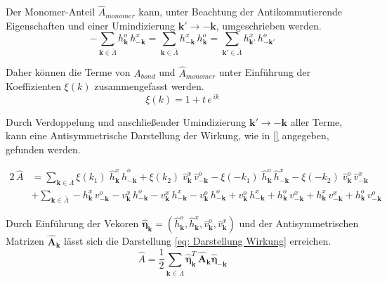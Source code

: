 \noindent Der Monomer-Anteil $\hat{A}_{monomer}$ kann, unter Beachtung der Antikommutierende Eigenschaften und einer Umindizierung $\bm{k'} \rightarrow -\bm{k}$, umgeschrieben werden.
\begin{equation}
-\sum_{\bm{k} \in \bar{\Lambda}} h_{\bm{k}}^o \,h_{-\bm{k}}^x = \sum_{\bm{k} \in \bar{\Lambda}} h_{-\bm{k}}^x \, h_{\bm{k}}^o  = 
\sum_{\bm{k'} \in \bar{\Lambda}} h_{\bm{k'}}^x \, h_{-\bm{k'}}^o  
\end{equation}

\noindent Daher können die Terme von $A_{bond}$ und $\hat{A}_{monomer}$ unter Einführung der Koeffizienten $\xi(k)$ zusammengefasst werden. 
\begin{equation} 
\xi(k) = 1 + t\,e^{\,ik} 
\end{equation}

\noindent Durch Verdoppelung und anschließender Umindizierung $\bm{k'} \rightarrow -\bm{k}$ aller Terme, kann eine Antisymmetrische Darstellung der Wirkung, wie in \eqref{} angegeben, gefunden werden.

\begin{align}
    2\,\hat{A}  
        &= \sum_{\bm{k} \in \bar{\Lambda}}  
        \xi(k_1) \; \hat{h}_{\bm{k}}^{x} \,\hat{h}_{-\bm{k}}^{o} 
        + \xi(k_2) \; \hat{v}_{\bm{k}}^{x} \,\hat{v}_{-\bm{k}}^{o}  
        - \xi(-k_1) \;  \hat{h}_{\bm{k}}^{o} \,\hat{h}_{-\bm{k}}^{x}
        - \xi(-k_2) \; \hat{v}_{\bm{k}}^{o} \,\hat{v}_{-\bm{k}}^{x}   \nonumber\\
        & + \sum_{\bm{k} \in \bar{\Lambda}}  
        - h_{\bm{k}}^x \,v_{-\bm{k}}^o 
        - v_{\bm{k}}^x\, h_{-\bm{k}}^o
        - v_{\bm{k}}^x \,h_{-\bm{k}}^x 
        - v_{\bm{k}}^o \,h_{-\bm{k}}^o 
        + v_{\bm{k}}^o \, h_{-\bm{k}}^x  
        + h_{\bm{k}}^o \, v_{-\bm{k}}^x
        + h_{\bm{k}}^x \, v_{-\bm{k}}^x 
        + h_{\bm{k}}^o \, v_{-\bm{k}}^o  \nonumber 
\end{align}

\noindent Durch Einführung der Vekoren $\bm{\hat{\eta}}_{\bm{k}} = (\hat{h}_{\bm{k}}^{o}, \hat{h}_{\bm{k}}^{x}, \hat{v}_{\bm{k}}^{o}, \hat{v}_{\bm{k}}^{x} )$ und der Antisymmetrischen Matrizen $\bm{\hat{A}}_{\bm{k}}$ lässt sich die Darstellung \eqref{eq: Darstellung Wirkung} erreichen. 
\begin{equation} \label{eq: Darstellung Wirkung}
    \hat{A} = \frac{1}{2} \sum_{\bm{k} \in \bar{\Lambda}} \bm{\hat{\eta}}_{\bm{k}}^T\, \bm{\hat{A}}_{\bm{k}} \bm{\hat{\eta}}_{-\bm{k}}
\end{equation}

